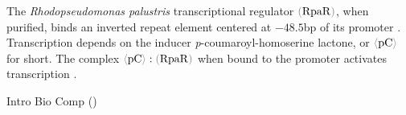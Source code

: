 \documentclass[12pt]{article}
\newcommand{\cbra}[1]{{\color{gray}\ensuremath{#1}}}
\newcommand{\signal}[1]{\ensuremath{\cbra{\langle}\mathrm{#1}\cbra{\rangle}}}
\newcommand{\protein}[1]{\ensuremath{\cbra{(}\mathrm{#1}\cbra{)}}}
\begin{document}
The \emph{Rhodopseudomonas palustris} transcriptional regulator
\protein{RpaR},
when purified,
binds an inverted repeat element 
centered at $-48.5$bp
of its promoter
\cite{HirakawaETAL2011}.
%
%
Transcription depends on the inducer 
\emph{p}-coumaroyl-homoserine lactone,
or \signal{pC} for short.
%
%
%
%
The complex 
$\signal{pC} : \protein{RpaR}$
when bound to the promoter
activates transcription
\cite[Discussion]{HirakawaETAL2011}.




\footnotesize



\leavevmode\vfill{\tiny\color{lightgray}\hfill{Intro Bio Comp (\DTMnow)}}
\end{document}
